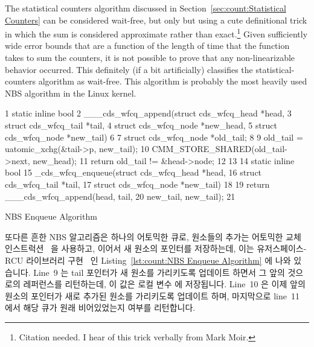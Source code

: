 The statistical counters algorithm discussed in
Section~\ref{sec:count:Statistical Counters}
can be considered wait-free, but only but using a cute definitional trick
in which the sum is considered approximate rather than exact.\footnote{
	Citation needed.
	I hear of this trick verbally from Mark Moir.}
Given sufficiently wide error bounds that are a function of the length
of time that the  function takes to sum the counters,
it is not possible to prove that any non-linearizable behavior occurred.
This definitely (if a bit artificially) classifies the statistical-counters
algorithm as wait-free.
This algorithm is probably the most heavily used NBS algorithm in
the Linux kernel.
\fi

\begin{listing}[tbp]
{ \scriptsize
\begin{verbbox}
 1 static inline bool
 2 ___cds_wfcq_append(struct cds_wfcq_head *head,
 3                    struct cds_wfcq_tail *tail,
 4                    struct cds_wfcq_node *new_head,
 5                    struct cds_wfcq_node *new_tail)
 6 {
 7   struct cds_wfcq_node *old_tail;
 8 
 9   old_tail = uatomic_xchg(&tail->p, new_tail);
10   CMM_STORE_SHARED(old_tail->next, new_head);
11   return old_tail != &head->node;
12 }
13 
14 static inline bool
15 _cds_wfcq_enqueue(struct cds_wfcq_head *head,
16                   struct cds_wfcq_tail *tail,
17                   struct cds_wfcq_node *new_tail)
18 {
19   return ___cds_wfcq_append(head, tail,
20                             new_tail, new_tail);
21 }
\end{verbbox}
}
\centering
\theverbbox
\caption{NBS Enqueue Algorithm}
\label{lst:count:NBS Enqueue Algorithm}
\end{listing}

또다른 흔한 NBS 알고리즘은 하나의 어토믹한 큐로, 원소들의 추가는 어토믹한 교체
인스트럭션~\cite{MagedMichael1993JPDC} 을 사용하고, 이어서 새 원소의
 포인터를 저장하는데, 이는 유저스페이스-RCU 라이브러리
구현~\cite{MathieuDesnoyers2009URCU} 인 Listing~\ref{lst:count:NBS Enqueue
Algorithm} 에 나와 있습니다.
Line~9 는 tail 포인터가 새 원소를 가리키도록 업데이트 하면서 그 앞의 것으로의
레퍼런스를 리턴하는데, 이 값은 로컬 변수  에 저장됩니다.
Line~10 은 이제 앞의 원소의  포인터가 새로 추가된 원소를 가리키도록
업데이트 하며, 마지막으로 line~11 에서 해당 큐가 원래 비어있었는지 여부를
리턴합니다.
\iffalse

Another common NBS algorithm is the atomic queue where elements are
enqueued using an atomic exchange instruction~\cite{MagedMichael1993JPDC},
followed by a store into the \co{->next} pointer of the new element's
predecessor, as shown in
Listing~\ref{lst:count:NBS Enqueue Algorithm},
which shows the userspace-RCU library
implementation~\cite{MathieuDesnoyers2009URCU}.
Line~9 updates the tail pointer to reference the new element while
returning a reference to its predecessor, which is stored in
local variable \co{old_tail}.
Line~10 then updates the predecessor's \co{->next} pointer to
reference the newly added element, and finally line~11
returns an indication as to whether or not the queue was initially
empty.
\fi

